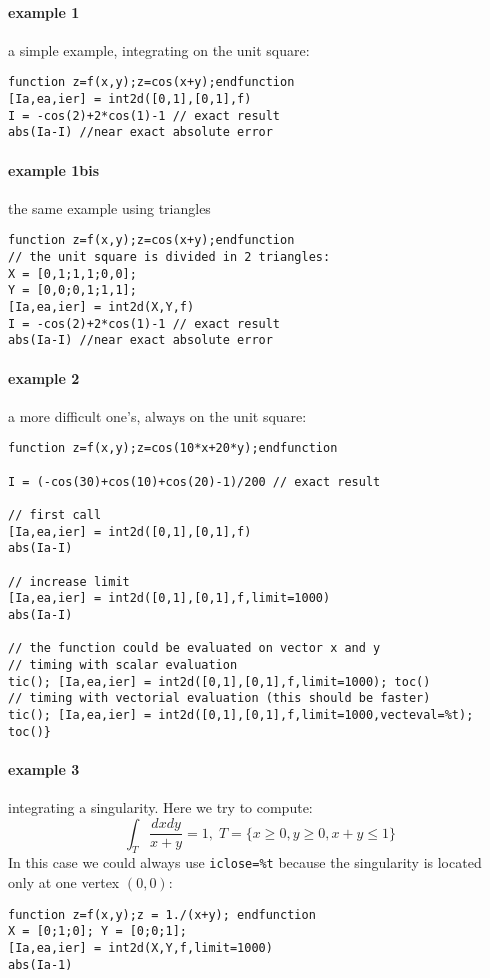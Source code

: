 \begin{examples}
  
\paragraph{example 1} a simple example, integrating on the unit square: 
\begin{Verbatim}
function z=f(x,y);z=cos(x+y);endfunction
[Ia,ea,ier] = int2d([0,1],[0,1],f) 
I = -cos(2)+2*cos(1)-1 // exact result  
abs(Ia-I) //near exact absolute error
\end{Verbatim}

\paragraph{example 1bis} the same example using triangles
\begin{Verbatim}
function z=f(x,y);z=cos(x+y);endfunction
// the unit square is divided in 2 triangles:
X = [0,1;1,1;0,0];
Y = [0,0;0,1;1,1];
[Ia,ea,ier] = int2d(X,Y,f)
I = -cos(2)+2*cos(1)-1 // exact result  
abs(Ia-I) //near exact absolute error
\end{Verbatim}
  
\paragraph{example 2} a more difficult one's, always on the unit square:
\begin{Verbatim}
function z=f(x,y);z=cos(10*x+20*y);endfunction

I = (-cos(30)+cos(10)+cos(20)-1)/200 // exact result  

// first call 
[Ia,ea,ier] = int2d([0,1],[0,1],f)
abs(Ia-I)

// increase limit
[Ia,ea,ier] = int2d([0,1],[0,1],f,limit=1000)
abs(Ia-I)

// the function could be evaluated on vector x and y
// timing with scalar evaluation
tic(); [Ia,ea,ier] = int2d([0,1],[0,1],f,limit=1000); toc()
// timing with vectorial evaluation (this should be faster)
tic(); [Ia,ea,ier] = int2d([0,1],[0,1],f,limit=1000,vecteval=%t); toc()}
\end{Verbatim}

\paragraph{example 3} integrating a singularity. Here we try to compute:
$$
    \int_T \frac{dxdy}{x+y} = 1, \; T = \{ x \ge 0, y \ge 0, x+y \le 1 \}
$$ 
In this case we could always use \verb+iclose=%t+ because the singularity is
located only at one vertex $(0,0)$:
\begin{Verbatim}
function z=f(x,y);z = 1./(x+y); endfunction
X = [0;1;0]; Y = [0;0;1];
[Ia,ea,ier] = int2d(X,Y,f,limit=1000)
abs(Ia-1)


\end{Verbatim}
\end{examples}
